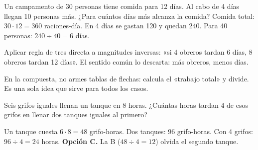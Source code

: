 \begin{ejemplo}[Provisiones]
Un campamento de 30 personas tiene comida para 12 días. Al cabo de 4 días llegan 10 personas más. ¿Para cuántos días
más alcanza la comida?
\solucion Comida total: $30 \cdot 12 = 360$ raciones-día. En 4 días se gastan 120 y quedan 240. Para 40 personas:
$240 \div 40 = 6$ días.
\end{ejemplo}

\begin{trampa}
Aplicar regla de tres directa a magnitudes inversas: «si 4 obreros tardan 6 días, 8 obreros tardan 12 días». El sentido
común lo descarta: más obreros, menos días.
\end{trampa}

\begin{atajo}
En la compuesta, no armes tablas de flechas: calcula el «trabajo total» y divide. Es una sola idea que sirve para todos
los casos.
\end{atajo}

\begin{reto}
Seis grifos iguales llenan un tanque en 8 horas. ¿Cuántas horas tardan 4 de esos grifos en llenar dos tanques iguales
al primero?
\end{reto}

\begin{retoresuelto}
Un tanque cuesta $6 \cdot 8 = 48$ grifo-horas. Dos tanques: 96 grifo-horas. Con 4 grifos: $96 \div 4 = 24$ horas.
\textbf{Opción C.} La B ($48 \div 4 = 12$) olvida el segundo tanque.
\end{retoresuelto}

